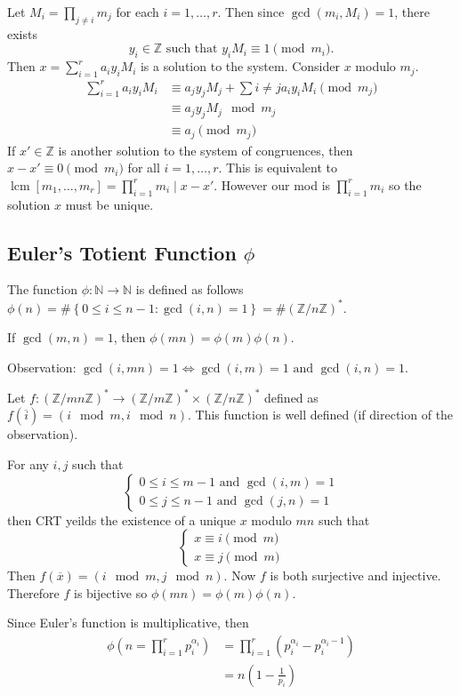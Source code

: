 \documentclass[11pt]{article}
\theoremstyle{definition}
\newcommand{\The}[2]{\begin{#1}#2\end{#1}}
\newcommand{\set}[1]{\left\{ #1 \right\}}
\newcommand{\rng}[2]{#1,\dots,#2}
\newcommand{\srng}[3]{#1_#2,\dots,#1_#3}
\newcommand{\st}[0]{\text{ such that }}
\newcommand{\et}[0]{\text{ and }}
\DeclareMathOperator{\lcm}{lcm}
\newcommand{\ZZ}{\mathbb{Z}}
\newcommand{\NN}{\mathbb{N}}
\begin{document}
\proof 
Let $M_i = \prod_{j\neq i} m_j$ for each $i=\rng{1}{r}$. Then since $\gcd(m_i,M_i)=1$, there exists 
$$ y_i\in\ZZ \st y_iM_i\equiv 1 \pmod{m_i} . $$
Then $x = \sum_{i=1}^{r} a_i y_i M_i$ is a solution to the system. Consider $x$ modulo $m_j$. 
\begin{align*}
	\sum_{i=1}^{r} a_i y_i M_i &\equiv a_j y_j M_j + \sum{i\neq j} a_i y_i M_i \pmod{m_j} \\
	&\equiv a_j y_j M_j \mod{m_j} \\
	&\equiv a_j \pmod{m_j}
\end{align*}
If $x'\in\ZZ$ is another solution to the system of congruences, then $x-x' \equiv 0 \pmod{m_i}$ for all $i = \rng{1}{r}$. This is equivalent to $\lcm[\srng{m}{1}{r}] = \prod_{i=1}^{r} m_i \mid x-x'$. However our mod is $\prod_{i=1}^{r}m_i$ so the solution $x$ must be unique. 
\qedhere

\subsection{Euler's Totient Function $\phi$}
The function $\phi:\NN\to\NN$ is defined as follows $\phi(n) = \#\set{0 \le i \le n-1 : \gcd(i,n)=1} = \#(\ZZ/n\ZZ)^*$.

\The{prop} {
	If $\gcd(m,n)=1$, then $\phi(mn) = \phi(m)\phi(n)$. 
}
\proof Observation: $\gcd(i,mn)=1 \iff \gcd(i,m)=1 \et \gcd(i,n)=1$. 

Let $f:(\ZZ/mn\ZZ)^* \to (\ZZ/m\ZZ)^* \times (\ZZ/n\ZZ)^*$ defined as $f(\overline{i}) = (i\mod{m}, i\mod{n})$. This function is well defined (if direction of the observation). 

For any $i,j$ such that 
$$ \begin{cases}
	0 \le i \le m-1 \et \gcd(i,m)=1 \\
	0 \le j \le n-1 \et \gcd(j,n)=1
\end{cases} $$
then CRT yeilds the existence of a unique $x$ modulo $mn$ such that 
$$ \begin{cases}
	x \equiv i \pmod{m} \\
	x \equiv j \pmod{m}
\end{cases} $$
Then $f(\overline{x}) = (i\mod{m}, j\mod{n})$. 
Now $f$ is both surjective and injective. 
Therefore $f$ is bijective so $\phi(mn) = \phi(m)\phi(n)$. 
\qedhere

Since Euler's function is multiplicative, then 
\begin{align*}
	\phi\left(n=\prod_{i=1}^{r}p_i^{\alpha_i}\right) &= \prod_{i=1}^{r}(p_i^{\alpha_i} - p_i^{\alpha_i-1}) \\
	&= n\left(1-\frac{1}{p_i}\right)
\end{align*}
\end{document}
